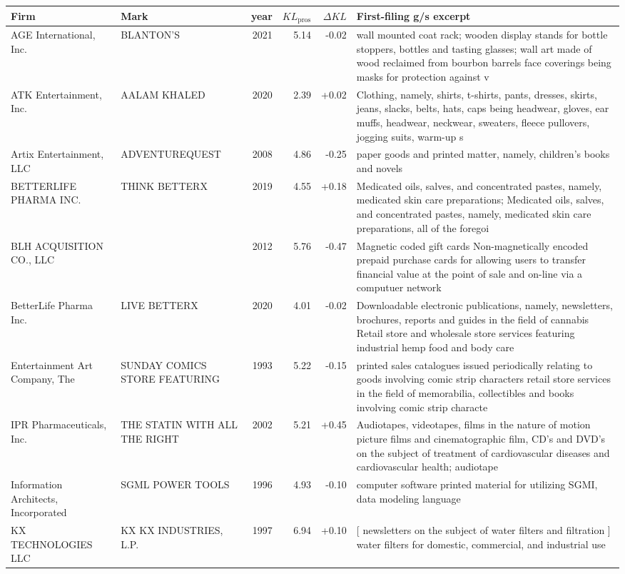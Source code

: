 \begin{tabular}{p{4.0cm}p{2.2cm}rrrp{6.5cm}}
\toprule
Firm & Mark & year & $KL_\text{pros}$ & $\Delta KL$ & First-filing g/s excerpt \\
\midrule
AGE International, Inc. & BLANTON'S & 2021 & 5.14 & -0.02 & wall mounted coat rack; wooden display stands for bottle stoppers, bottles and tasting glasses; wall art made of wood reclaimed from bourbon barrels face coverings being masks for protection against v \\
ATK Entertainment, Inc. & AALAM KHALED & 2020 & 2.39 & +0.02 & Clothing, namely, shirts, t-shirts, pants, dresses, skirts, jeans, slacks, belts, hats, caps being headwear, gloves, ear muffs, headwear, neckwear, sweaters, fleece pullovers, jogging suits, warm-up s \\
Artix Entertainment, LLC & ADVENTUREQUEST & 2008 & 4.86 & -0.25 & paper goods and printed matter, namely, children's books and novels \\
BETTERLIFE PHARMA INC. & THINK BETTERX & 2019 & 4.55 & +0.18 & Medicated oils, salves, and concentrated pastes, namely, medicated skin care preparations; Medicated oils, salves, and concentrated pastes, namely, medicated skin care preparations, all of the foregoi \\
BLH ACQUISITION CO., LLC &  & 2012 & 5.76 & -0.47 & Magnetic coded gift cards Non-magnetically encoded prepaid purchase cards for allowing users to transfer financial value at the point of sale and on-line via a computuer network \\
BetterLife Pharma Inc. & LIVE BETTERX & 2020 & 4.01 & -0.02 & Downloadable electronic publications, namely, newsletters, brochures, reports and guides in the field of cannabis Retail store and wholesale store services featuring industrial hemp food and body care \\
Entertainment Art Company, The & SUNDAY COMICS STORE FEATURING  & 1993 & 5.22 & -0.15 & printed sales catalogues issued periodically relating to goods involving comic strip characters retail store services in the field of memorabilia, collectibles and books involving comic strip characte \\
IPR Pharmaceuticals, Inc. & THE STATIN WITH ALL THE RIGHT  & 2002 & 5.21 & +0.45 & Audiotapes, videotapes, films in the nature of motion picture films and cinematographic film, CD's and DVD's on the subject of treatment of cardiovascular diseases and cardiovascular health; audiotape \\
Information Architects, Incorporated & SGML POWER TOOLS & 1996 & 4.93 & -0.10 & computer software printed material for utilizing SGMI, data modeling language \\
KX TECHNOLOGIES LLC & KX KX INDUSTRIES, L.P. & 1997 & 6.94 & +0.10 & [ newsletters on the subject of water filters and filtration ] water filters for domestic, commercial, and industrial use \\
\bottomrule
\end{tabular}
\clearpage

